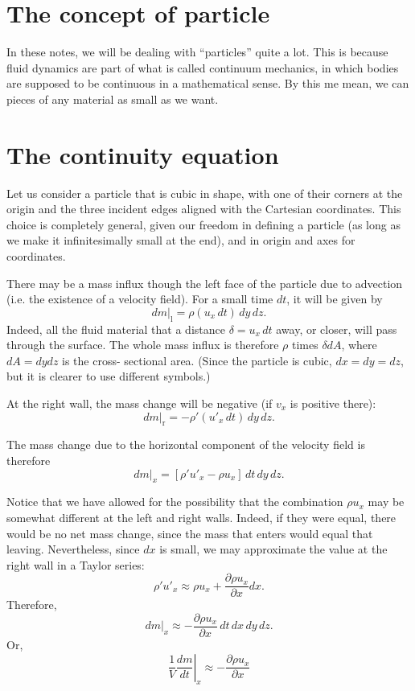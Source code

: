 \section{The concept of particle}

In these notes, we will be dealing with ``particles'' 
quite a lot. This is because fluid dynamics are part of what is called
continuum mechanics, in which bodies are supposed to be continuous in
a mathematical sense. By this me mean, we can pieces of any material
as small as we want. 




\section{The continuity equation}
\label{sec:continuity}

Let us consider a particle that is cubic in shape, with one of their
corners at the origin and the three incident edges aligned with the
Cartesian coordinates. This choice is completely general, given our
freedom in defining a particle (as long as we make it infinitesimally
small at the end), and in origin and axes for coordinates.

There may be a mass influx though the left face of the particle due
to advection (i.e. the existence of a velocity field). For a small
time $dt$, it will be given by
\[
\left. d m \right|_\text{l} =
\rho ( u_x \, dt) \, dy\, dz .
\]
Indeed, all the fluid material that a distance $\delta= u_x \, dt$
away, or closer, will pass through the surface. The whole mass influx
is therefore $\rho$ times $\delta dA$, where $dA=dy dz$ is the cross-
sectional area. (Since the particle is cubic, $dx=dy=dz$, but it is
clearer to use different symbols.)

At the right wall, the mass change will be negative (if $v_x$ is positive
there):
\[
\left. d m \right|_\text{r} =
 -  \rho' ( u'_x \, dt) \, dy\, dz .
\]

The mass change due to the horizontal component of the velocity field is
therefore
\[
\left. d m \right|_x =
  \left[  \rho'  u'_x -  \rho  u_x \right] \, dt \, dy\, dz .
\]

Notice that we have allowed for the possibility that the combination
$\rho u_x$ may be somewhat different at the left and right
walls. Indeed, if they were equal, there would be no net mass change,
since the mass that enters would equal that leaving. Nevertheless,
since $dx$ is small, we may approximate the value at the right
wall in a Taylor series:
\[
\rho'  u'_x \approx  \rho  u_x  +
\frac{\partial  \rho  u_x}{\partial x} dx .
\]
Therefore,
\[
\left. d m \right|_x \approx
-\frac{\partial  \rho  u_x}{\partial x} \, dt \, dx \, dy\, dz .
\]
Or,
\[
\frac1V \left. \frac{d m}{d t} \right|_x \approx
-\frac{\partial  \rho  u_x}{\partial x}
\]

